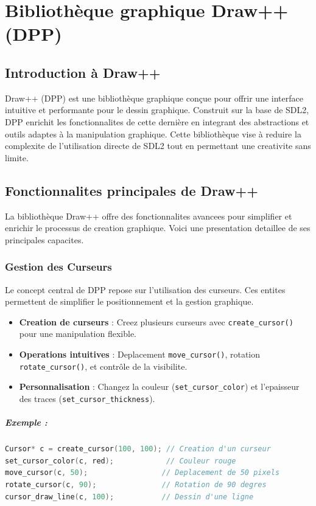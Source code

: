 \documentclass[12pt,a4paper]{report}
\begin{document}
\chapter{Bibliothèque graphique Draw++ (DPP)}

\section{Introduction à Draw++}
Draw++ (DPP) est une bibliothèque graphique conçue pour offrir une interface intuitive et performante pour le dessin graphique. Construit sur la base de SDL2, DPP enrichit les fonctionnalites de cette dernière en integrant des abstractions et outils adaptes à la manipulation graphique. Cette bibliothèque vise à reduire la complexite de l’utilisation directe de SDL2 tout en permettant une creativite sans limite.

\section{Fonctionnalites principales de Draw++}
La bibliothèque Draw++ offre des fonctionnalites avancees pour simplifier et enrichir le processus de creation graphique. Voici une presentation detaillee de ses principales capacites.

\subsection{Gestion des Curseurs}
Le concept central de DPP repose sur l’utilisation des curseurs. Ces entites permettent de simplifier le positionnement et la gestion graphique.

\begin{itemize}
    \item \textbf{Creation de curseurs} : Creez plusieurs curseurs avec \texttt{create\_cursor()} pour une manipulation flexible.
    \item \textbf{Operations intuitives} : Deplacement \texttt{move\_cursor()}, rotation \texttt{rotate\_cursor()}, et contrôle de la visibilite.
    \item \textbf{Personnalisation} : Changez la couleur (\texttt{set\_cursor\_color}) et l’epaisseur des traces (\texttt{set\_cursor\_thickness}).
\end{itemize}

\paragraph{Exemple :}
\begin{lstlisting}[language=C]
Cursor* c = create_cursor(100, 100); // Creation d'un curseur
set_cursor_color(c, red);            // Couleur rouge
move_cursor(c, 50);                 // Deplacement de 50 pixels
rotate_cursor(c, 90);               // Rotation de 90 degres
cursor_draw_line(c, 100);           // Dessin d'une ligne
\end{lstlisting}
\end{document}
